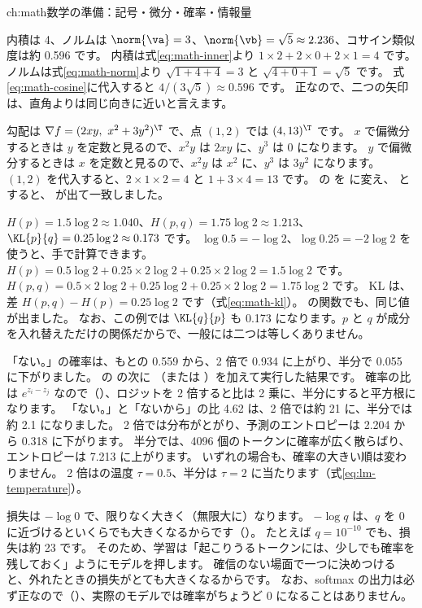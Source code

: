 \begin{answers}{ch:math}{数学の準備：記号・微分・確率・情報量}
\item 内積は 4、ノルムは $\norm{\va}=3$、$\norm{\vb}=\sqrt{5}\approx 2.236$、コサイン類似度は約 0.596 です。
内積は式\eqref{eq:math-inner}より $1\times 2+2\times 0+2\times 1=4$ です。
ノルムは式\eqref{eq:math-norm}より $\sqrt{1+4+4}=3$ と $\sqrt{4+0+1}=\sqrt{5}$ です。
式\eqref{eq:math-cosine}に代入すると $4/(3\sqrt{5})\approx 0.596$ です。
正なので、二つの矢印は、直角よりは同じ向きに近いと言えます。
\item 勾配は $\nabla f=(2xy,\ x^{2}+3y^{2})^\T$ で、点 $(1,2)$ では $(4,13)^\T$ です。
$x$ で偏微分するときは $y$ を定数と見るので、$x^{2}y$ は $2xy$ に、$y^{3}$ は 0 になります。
$y$ で偏微分するときは $x$ を定数と見るので、$x^{2}y$ は $x^{2}$ に、$y^{3}$ は $3y^{2}$ になります。
$(1,2)$ を代入すると、$2\times1\times2=4$ と $1+3\times 4=13$ です。
 の  を  に変え、 とすると、\code{[4. 13.]} が出て一致しました。
\item $H(p)=1.5\log 2\approx 1.040$、$H(p,q)=1.75\log 2\approx 1.213$、$\KL{p}{q}=0.25\log 2\approx 0.173$ です。
$\log 0.5=-\log 2$、$\log 0.25=-2\log 2$ を使うと、手で計算できます。
$H(p)=0.5\log 2+0.25\times 2\log 2+0.25\times 2\log 2=1.5\log 2$ です。
$H(p,q)=0.5\times 2\log 2+0.25\log 2+0.25\times 2\log 2=1.75\log 2$ です。
KL は、差 $H(p,q)-H(p)=0.25\log 2$ です（式\eqref{eq:math-kl}）。
 の関数でも、同じ値が出ました。
なお、この例では $\KL{q}{p}$ も 0.173 になります。$p$ と $q$ が成分を入れ替えただけの関係だからで、一般には二つは等しくありません。
\item 「ない。」の確率は、もとの 0.559 から、2 倍で 0.934 に上がり、半分で 0.055 に下がりました。
 の  の次に （または ）を加えて実行した結果です。
確率の比は $e^{z_i-z_j}$ なので（）、ロジットを 2 倍すると比は 2 乗に、半分にすると平方根になります。
「ない。」と「ないから」の比 4.62 は、2 倍では約 21 に、半分では約 2.1 になりました。
2 倍では分布がとがり、予測のエントロピーは 2.204 から 0.318 に下がります。
半分では、4096 個のトークンに確率が広く散らばり、エントロピーは 7.213 に上がります。
いずれの場合も、確率の大きい順は変わりません。
2 倍はの温度 $\tau=0.5$、半分は $\tau=2$ に当たります（式\eqref{eq:lm-temperature}）。
\item 損失は $-\log 0$ で、限りなく大きく（無限大に）なります。
$-\log q$ は、$q$ を 0 に近づけるといくらでも大きくなるからです（）。
たとえば $q=10^{-10}$ でも、損失は約 23 です。
そのため、学習は「起こりうるトークンには、少しでも確率を残しておく」ようにモデルを押します。
確信のない場面で一つに決めつけると、外れたときの損失がとても大きくなるからです。
なお、softmax の出力は必ず正なので（）、実際のモデルでは確率がちょうど 0 になることはありません。
\end{answers}
